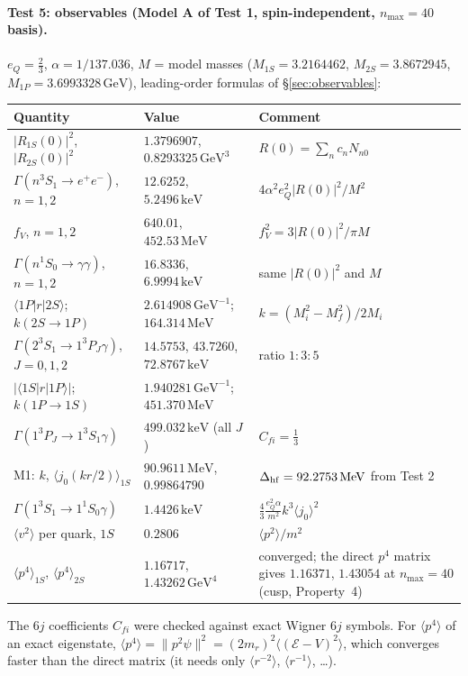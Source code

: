 \documentclass[11pt,a4paper]{article}
\numberwithin{equation}{section}
\theoremstyle{definition}
\theoremstyle{plain}
\theoremstyle{remark}
\numberwithin{algorithm}{section}
\newcommand{\mr}{m_r}
\newcommand{\GeV}{\,\mathrm{GeV}}
\newcommand{\MeV}{\,\mathrm{MeV}}
\newcommand{\keV}{\,\mathrm{keV}}
\begin{document}
\paragraph{Test 5: observables (Model A of Test 1, spin-independent, $n_{\max}=40$ basis).} $e_Q=\frac23$, $\alpha=1/137.036$, $M$ = model masses ($M_{1S}=3.2164462$, $M_{2S}=3.8672945$, $M_{1P}=3.6993328\GeV$), leading-order formulas of \S\ref{sec:observables}:
\begin{center}\small
\begin{tabular}{@{}>{\raggedright\arraybackslash}p{6.0cm}>{\raggedright\arraybackslash}p{3.9cm}>{\raggedright\arraybackslash}p{4.9cm}@{}}\toprule
Quantity & Value & Comment\\\midrule
$|R_{1S}(0)|^2$, $|R_{2S}(0)|^2$ & $1.3796907$, $0.8293325\GeV^3$ & $R(0)=\sum_nc_nN_{n0}$\\
$\Gamma(n^3S_1\to e^+e^-)$, $n=1,2$ & $12.6252$, $5.2496\keV$ & $4\alpha^2e_Q^2|R(0)|^2/M^2$\\
$f_V$, $n=1,2$ & $640.01$, $452.53\MeV$ & $f_V^2=3|R(0)|^2/\pi M$\\
$\Gamma(n^1S_0\to\gamma\gamma)$, $n=1,2$ & $16.8336$, $6.9994\keV$ & same $|R(0)|^2$ and $M$\\
$\langle1P|r|2S\rangle$; $k(2S\to1P)$ & $2.614908\GeV^{-1}$; $164.314\MeV$ & $k=(M_i^2-M_f^2)/2M_i$\\
$\Gamma(2^3S_1\to1^3P_J\gamma)$, $J=0,1,2$ & $14.5753$, $43.7260$, $72.8767\keV$ & ratio $1:3:5$\\
$|\langle1S|r|1P\rangle|$; $k(1P\to1S)$ & $1.940281\GeV^{-1}$; $451.370\MeV$ & \\
$\Gamma(1^3P_J\to1^3S_1\gamma)$ & $499.032\keV$ (all $J$) & $C_{fi}=\frac13$\\
M1: $k$, $\langle j_0(kr/2)\rangle_{1S}$ & $90.9611\MeV$, $0.99864790$ & $\Delta_{\rm hf}=92.2753\MeV$ from Test 2\\
$\Gamma(1^3S_1\to1^1S_0\gamma)$ & $1.4426\keV$ & $\frac43\frac{e_Q^2\alpha}{m^2}k^3\langle j_0\rangle^2$\\
$\langle v^2\rangle$ per quark, $1S$ & $0.2806$ & $\langle p^2\rangle/m^2$\\
$\langle p^4\rangle_{1S}$, $\langle p^4\rangle_{2S}$ & $1.16717$, $1.43262\GeV^4$ & converged; the direct $p^4$ matrix gives $1.16371$, $1.43054$ at $n_{\max}=40$ (cusp, Property~4)\\\bottomrule
\end{tabular}
\end{center}
The $6j$ coefficients $C_{fi}$ were checked against exact Wigner $6j$ symbols. For $\langle p^4\rangle$ of an exact eigenstate, $\langle p^4\rangle=\|p^2\psi\|^2=(2\mr)^2\langle(\mathcal E-V)^2\rangle$, which converges faster than the direct matrix (it needs only $\langle r^{-2}\rangle$, $\langle r^{-1}\rangle$, \dots).
\end{document}
